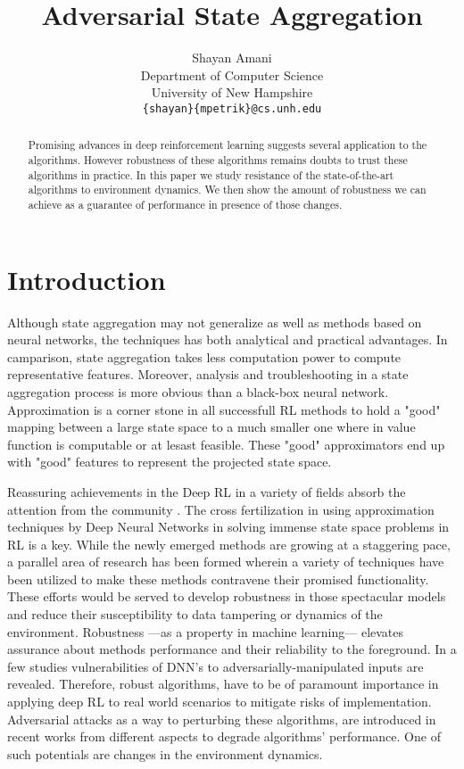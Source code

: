 \documentclass{article}
\title{Adversarial State Aggregation}
\author{%
Shayan Amani \\ %
Department of Computer Science\\
University of New Hampshire \\
\texttt{\{shayan\}\{mpetrik\}@cs.unh.edu} \\
}
\begin{document}
    \maketitle

    \begin{abstract}
        Promising advances in deep reinforcement learning suggests several application to the algorithms. However
        robustness of these algorithms remains doubts to trust these algorithms in practice. In this paper we study
        resistance of the state-of-the-art algorithms to environment dynamics. We then show the amount of robustness
        we can achieve as a guarantee of performance in presence of those changes.
    \end{abstract}


    \section{Introduction}
    Although state aggregation may not generalize as well as methods based on neural networks, the techniques has
    both analytical and practical advantages. In camparison, state aggregation takes less computation power to
    compute representative features. Moreover, analysis and troubleshooting in a state aggregation process is more
    obvious than a black-box neural network. Approximation is a corner stone in all successfull RL methods to hold a
    "good" mapping between a large state space to a much smaller one where in value function is computable or at
    lesast feasible. These "good" approximators end up with "good" features to represent the projected state space.

    Reassuring achievements in the Deep RL in a variety of fields absorb the attention from the community
    \citep{Mnih2015, Schulman2015TrustOptimization, Lillicrap2015ContinuousDDPG, silver2016a}. The cross
    fertilization in using approximation techniques by Deep Neural Networks in solving immense state space problems
    in RL is a key. While the newly emerged methods are growing at a staggering pace, a parallel area of research
    has been formed wherein a variety of techniques have been utilized to make these methods contravene their
    promised functionality. These efforts would be served to develop robustness in those spectacular models and
    reduce their susceptibility to data tampering or dynamics of the environment. Robustness ---as a property in
    machine learning--- elevates assurance about methods performance and their reliability to the foreground. In a
    few studies \cite{Goodfellow2014}  vulnerabilities of DNN's to adversarially-manipulated inputs are revealed.
    Therefore, robust algorithms, have to be of paramount importance in applying deep RL to real world scenarios to
    mitigate risks of implementation. Adversarial attacks as a way to perturbing these algorithms, are introduced in
    recent works \cite{Huang2017, Kos2017} from different aspects to degrade algorithms' performance. One of such
    potentials are changes in the environment dynamics.
\end{document}
